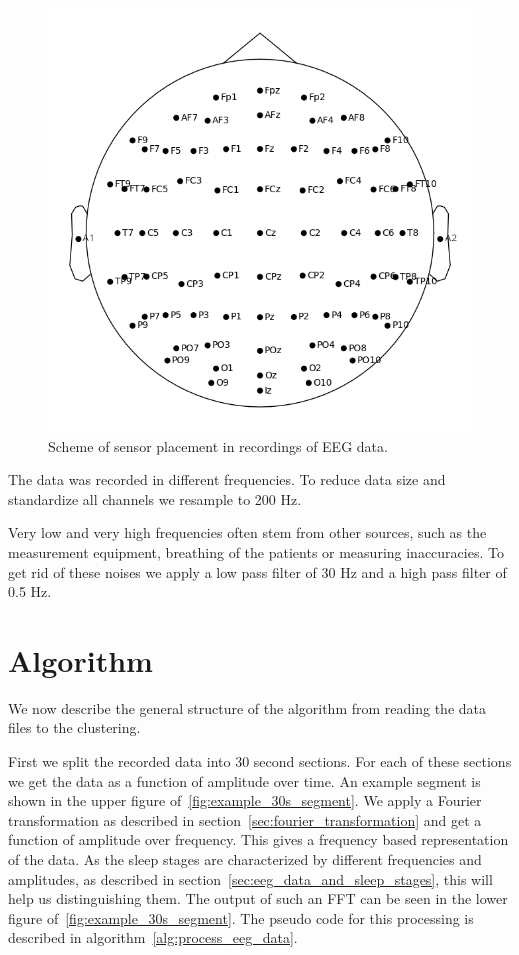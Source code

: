 \begin{figure}
	\centering
	\includegraphics[width=0.7\linewidth]{figs/head_placement}
	\caption{Scheme of sensor placement in recordings of EEG data.}
	\label{fig:head_placement}
\end{figure}

The data was recorded in different frequencies. To reduce data size and standardize all channels we resample to 200 Hz.

Very low and very high frequencies often stem from other sources, such as the measurement equipment, breathing of the patients or measuring inaccuracies. To get rid of these noises we apply a low pass filter of 30 Hz and a high pass filter of 0.5 Hz.

\section{Algorithm}
\label{sec:algorithm}

We now describe the general structure of the algorithm from reading the data files to the clustering.

First we split the recorded data into 30 second sections. For each of these sections we get the data as a function of amplitude over time. An example segment is shown in the upper figure of~\ref{fig:example_30s_segment}. We apply a Fourier transformation as described in section~\ref{sec:fourier_transformation} and get a function of amplitude over frequency. This gives a frequency based representation of the data. As the sleep stages are characterized by different frequencies and amplitudes, as described in section~\ref{sec:eeg_data_and_sleep_stages}, this will help us distinguishing them. The output of such an FFT can be seen in the lower figure of~\ref{fig:example_30s_segment}. The pseudo code for this processing is described in algorithm~\ref{alg:process_eeg_data}.

